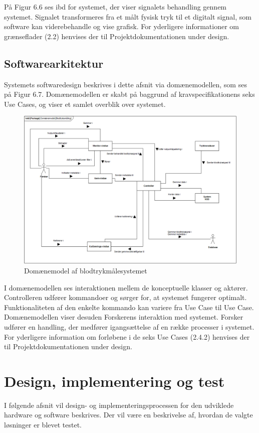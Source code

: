 På Figur 6.6 ses ibd for systemet, der viser signalets behandling gennem systemet. Signalet transformeres fra et målt fysisk tryk til et digitalt signal, som software kan viderebehandle og vise grafisk. For yderligere informationer om grænseflader (2.2) henvises der til Projektdokumentationen under design.

 
\subsection{Softwarearkitektur}
Systemets softwaredesign beskrives i dette afsnit via domænemodellen, som ses på Figur 6.7. Domænemodellen er skabt på baggrund af kravspecifikationens seks Use Cases, og viser et samlet overblik over systemet. 
\begin{figure}[H]
	\centering
	\includegraphics[width=1\textwidth]{Figurer/dm}
	\caption{Domænemodel af blodtrykmålesystemet}
\end{figure}
I domænemodellen ses interaktionen mellem de konceptuelle klasser og aktører. Controlleren udfører kommandoer og sørger for, at systemet fungerer optimalt. Funktionaliteten af den enkelte kommando kan variere fra Use Case til Use Case. Domænemodellen viser desuden Forskerens interaktion med systemet. Forsker udfører en handling, der medfører igangsættelse af en række processer i systemet. 
For yderligere information om forløbene i de seks Use Cases (2.4.2) henvises der til Projektdokumentationen under design. 


\section{Design, implementering og test}
I følgende afsnit vil design- og implementeringsprocessen for den udviklede hardware og software beskrives. Der vil være en beskrivelse af, hvordan de valgte løsninger er blevet testet. 


